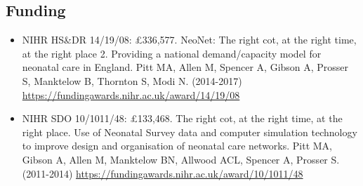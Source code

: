 \subsection{Funding}

\begin{itemize}
    \item NIHR HS\&DR 14/19/08: £336,577. NeoNet: The right cot, at the right time, at the right place 2. Providing a national demand/capacity model for neonatal care in England. Pitt MA, Allen M, Spencer A, Gibson A, Prosser S, Manktelow B, Thornton S, Modi N. (2014-2017) \url{https://fundingawards.nihr.ac.uk/award/14/19/08}

    \item NIHR SDO 10/1011/48: £133,468. The right cot, at the right time, at the right place. Use of Neonatal Survey data and computer simulation technology to improve design and organisation of neonatal care networks. Pitt MA, Gibson A, Allen M, Manktelow BN, Allwood ACL, Spencer A, Prosser S. (2011-2014) \url{https://fundingawards.nihr.ac.uk/award/10/1011/48}
\end{itemize}

